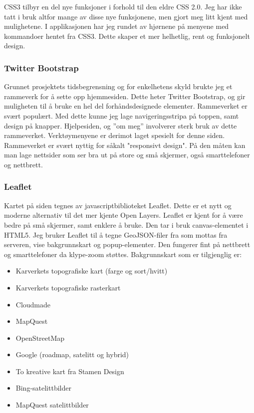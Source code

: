 \documentclass[12pt,twoside,onecolumn]{article}
\begin{document}
		CSS3 tilbyr en del nye funksjoner i forhold til den eldre CSS 2.0. Jeg har ikke tatt i bruk altfor mange av disse nye funksjonene, men gjort meg litt kjent med mulighetene. I applikasjonen har jeg rundet av hjørnene på menyene med kommandoer hentet fra CSS3. Dette skaper et mer helhetlig, rent og funksjonelt design. 
	
		\subsubsection{Twitter Bootstrap\cite{bootstrap}}
			
			Grunnet prosjektets tidsbegrensning og for enkelhetens skyld brukte jeg et rammeverk for å sette opp hjemmesiden. Dette heter Twitter Bootstrap, og gir muligheten til å bruke en hel del forhåndsdesignede elementer. Rammeverket er svært populært. Med dette kunne jeg lage navigeringsstripa på toppen, samt design på knapper. Hjelpesiden, og ''om meg'' involverer sterk bruk av dette rammeverket. Verktøymenyene er derimot laget spesielt for denne siden. Rammeverket er svært nyttig for såkalt "responsivt design". På den måten kan man lage nettsider som ser bra ut på store og små skjermer, også smarttelefoner og nettbrett. 
			
		\subsubsection{Leaflet\cite{leaflet}}
		
			Kartet på siden tegnes av javascriptbiblioteket Leaflet. Dette er et nytt og moderne alternativ til det mer kjente Open Layers. Leaflet er kjent for å være bedre på små skjermer, samt enklere å bruke. Den tar i bruk canvas-elementet i HTML5. Jeg bruker Leaflet til å tegne GeoJSON-filer fra som mottas fra serveren, vise bakgrunnskart og popup-elementer. Den fungerer fint på nettbrett og smarttelefoner da klype-zoom støttes. Bakgrunnskart som er tilgjenglig er:
			
			\begin{itemize}
				\item Karverkets topografiske kart (farge og sort/hvitt)
				\item Karverkets topografiske rasterkart
				\item Cloudmade
				\item MapQuest
				\item OpenStreetMap
				\item Google (roadmap, satelitt og hybrid)
				\item To kreative kart fra Stamen Design
				\item Bing-satelittbilder
				\item MapQuest satelittbilder
			\end{itemize}
			
\end{document}

